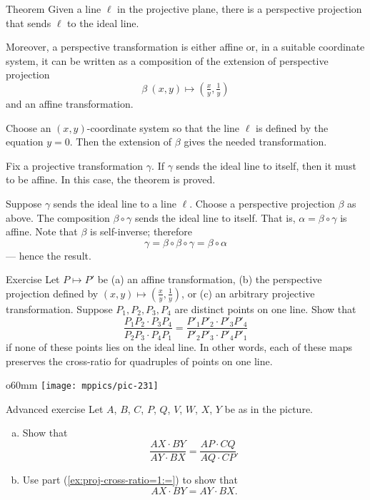 \begin{thm}{Theorem}\label{thm:moving}
Given a line $\ell$ in the projective plane, there is a perspective projection that sends $\ell$ to the ideal line.

Moreover, a perspective transformation is either affine or, in a suitable coordinate system, it can be written as a composition of the extension of perspective projection 
\[\beta\:(x,y)\mapsto (\tfrac xy,\tfrac 1y)\]
and an affine transformation.
\end{thm}

Choose an $(x,y)$-coordinate system so that the line $\ell$ is defined by the equation $y=0$. 
Then the extension of $\beta$ gives the needed transformation.

Fix a projective transformation $\gamma$.
If $\gamma$ sends the ideal line to itself,
then it must to be affine. 
In this case, the theorem is proved.

Suppose $\gamma$ sends the ideal line to a line $\ell$.
Choose a perspective projection $\beta$ as above.
The composition $\beta\circ\gamma$ sends the ideal line to itself.
That is, $\alpha=\beta\circ\gamma$ is affine.
Note that $\beta$ is self-inverse; therefore 
\[\gamma=\beta\circ\beta\circ\gamma=\beta\circ\alpha\]
--- hence the result.
\qeds

\begin{thm}{Exercise}\label{ex:proj-cross-ratio}
Let $P\mapsto P'$ be (a) an affine transformation, (b) the perspective projection defined by $(x,y)\mapsto (\tfrac xy,\tfrac 1y)$, or (c) an arbitrary projective transformation.
Suppose $P_1,P_2,P_3,P_4$ are distinct points on one line.
Show that 
\[\frac{P_1P_2\cdot P_3P_4}{P_2P_3\cdot P_4P_1}=\frac{P'_1P'_2\cdot P'_3P'_4}{P'_2P'_3\cdot P'_4P'_1}\]
if none of these points lies on the ideal line.
In other words, each of these maps preserves the cross-ratio for quadruples of points on one line.

\end{thm}

{

\begin{wrapfigure}{o}{60mm}
\vskip-0mm
\centering
\texttt{[image: mppics/pic-231]}
\end{wrapfigure}

\begin{thm}{Advanced exercise}\label{ex:proj-cross-ratio=1}
Let $A$, $B$, $C$, $P$, $Q$, $V$, $W$, $X$, $Y$ be as in the picture.
\begin{enumerate}[(a)]
\item\label{ex:proj-cross-ratio=1:=} Show that 
\[\frac{AX\cdot BY}{AY\cdot BX}=\frac{AP\cdot CQ}{AQ\cdot CP}.\]
\item\label{ex:proj-cross-ratio=1:1} 
Use part (\ref{ex:proj-cross-ratio=1:=}) to show that
\[AX\cdot BY=AY\cdot BX.\]
\end{enumerate}

\end{thm}

}


